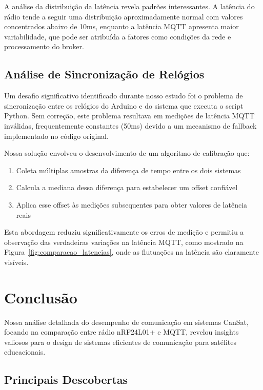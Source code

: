 \documentclass[hidelinks]{sbrt}
\begin{document}
A análise da distribuição da latência revela padrões interessantes. A latência do rádio tende a seguir uma distribuição aproximadamente normal com valores concentrados abaixo de 10ms, enquanto a latência MQTT apresenta maior variabilidade, que pode ser atribuída a fatores como condições da rede e processamento do broker.


\subsection{Análise de Sincronização de Relógios}

Um desafio significativo identificado durante nosso estudo foi o problema de sincronização entre os relógios do Arduino e do sistema que executa o script Python. Sem correção, este problema resultava em medições de latência MQTT inválidas, frequentemente constantes (50ms) devido a um mecanismo de fallback implementado no código original.

Nossa solução envolveu o desenvolvimento de um algoritmo de calibração que:
\begin{enumerate}
    \item Coleta múltiplas amostras da diferença de tempo entre os dois sistemas
    \item Calcula a mediana dessa diferença para estabelecer um offset confiável
    \item Aplica esse offset às medições subsequentes para obter valores de latência reais
\end{enumerate}

Esta abordagem reduziu significativamente os erros de medição e permitiu a observação das verdadeiras variações na latência MQTT, como mostrado na Figura~\ref{fig:comparacao_latencias}, onde as flutuações na latência são claramente visíveis.
\section{Conclusão}

Nossa análise detalhada do desempenho de comunicação em sistemas CanSat, focando na comparação entre rádio nRF24L01+ e MQTT, revelou insights valiosos para o design de sistemas eficientes de comunicação para satélites educacionais.

\subsection{Principais Descobertas}
\end{document}
